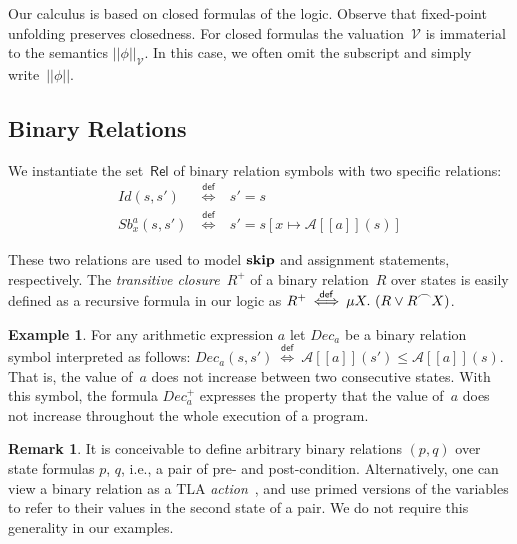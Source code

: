 \documentclass[10pt,a4paper]{amsart}
\theoremstyle{definition}
\newtheorem{example}[theorem]{Example}
\newtheorem{remark}[theorem]{Remark}
\newcommand{\defequiv}{\stackrel{\mathsf{def}}{\Longleftrightarrow}}
\newcommand{\denot}[1]{\left[\!\left[#1\right]\!\right]}
\newcommand{\fdenot}[1]{\left|\!\left|#1\right|\!\right|}
\newcommand{\arexdenot}[1]{\mathcal{A}\!\denot{#1}}
\newcommand{\bexdenot}[1]{\mathcal{B}\!\denot{#1}}
\newcommand{\logdenot}[1]{\left|\!\left|#1\right|\!\right|_{\mathcal{V}}}
\newcommand{\chop}[0]{\raisebox{1ex}{$\frown$}}
\newcommand{\Skip}{\mbox{\bf skip}}
\newcommand{\ttt}{\mbox{\bf tt}}
\begin{document}
Our calculus is based on closed formulas of the logic.  Observe that
fixed-point unfolding preserves closedness.  For closed formulas the
valuation~$\mathcal{V}$ is immaterial to the semantics
$\logdenot{\phi}$. In this case, we often omit the subscript and
simply write~$\fdenot{\phi}$.


\subsection{Binary Relations}
\label{sec:binary-relations}

We instantiate the set~$\mathsf{Rel}$ of binary relation symbols with
two specific relations:
% 
$$
\begin{array}{rcl}
  \mathit{Id} (s, s')  &  
                         \>\defequiv\>  &  
                                          s' = s \\
  \mathit{Sb}^{a}_{x} (s, s')  &  
                                 \>\defequiv\>  &  
                                                  s' = s[x \mapsto \arexdenot{a} (s)]
\end{array}
$$

These two relations are used to model $\Skip$ and assignment
statements, respectively.
%
The \emph{transitive closure}~$R^+$ of a binary relation~$R$ over
states is easily defined as a recursive formula in our logic as
%
$ R^+ \>\defequiv\> \mu X.\ (R \vee R \chop X) $.


\begin{example}
  \label{ex:form-1}
  For any arithmetic expression $a$ let $\mathit{Dec}_a$ be a binary
  relation symbol interpreted as follows:
  $
  \mathit{Dec}_a (s, s')  \>\defequiv\> 
  \arexdenot{a} (s') \leq \arexdenot{a} (s)
  $.
  That is, the value of~$a$ does not increase between two consecutive
  states.
  With this symbol, the formula $\mathit{Dec}_a^+$ expresses the
  property that the value of~$a$ does not increase throughout the
  whole execution of a program.
\end{example}

\begin{remark}
  It is conceivable to define arbitrary binary relations $(p,q)$ over
  state formulas $p$, $q$, i.e., a pair of pre- and post-condition.
  Alternatively, one can view a binary relation as a TLA
  \emph{action}~\cite{lam-94-tla}, and use primed versions of the
  variables to refer to their values in the second state of a pair.
  We do not require this generality in our examples.
\end{remark}
\end{document}
